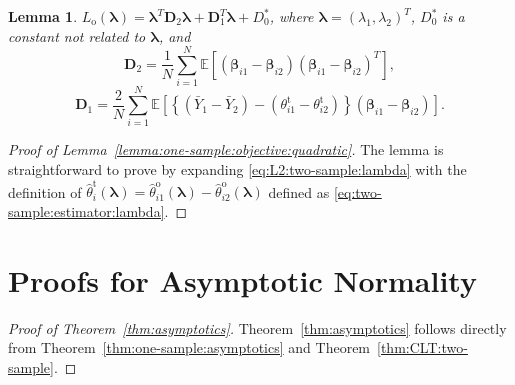 \documentclass[12pt,letterpaper]{article}
\newtheorem{lemma}{Lemma}[section]
\begin{document}
\begin{lemma}\label{lemma:two-sample:objective:quadratic}
$L_{\mathrm{o}}(\boldsymbol{\lambda})=\boldsymbol{\lambda}^T\mathbf{D}_{2}\boldsymbol{\lambda}+\mathbf{D}_{1}^T\boldsymbol{\lambda}+D_0^*$, where $\boldsymbol{\lambda}=(\lambda_1,\lambda_2)^T$, $D_0^*$ is a constant not related to $\boldsymbol{\lambda}$, and 
\begin{equation}\label{eq:coefficient:quadratic:two-sample:objective}
    \mathbf{D}_{2}=\frac{1}{N}\sum_{i=1}^N\mathbb{E}\left[(\boldsymbol{\beta}_{i1}-\boldsymbol{\beta}_{i2})(\boldsymbol{\beta}_{i1}-\boldsymbol{\beta}_{i2})^T\right],
\end{equation}
\begin{equation}\label{eq:coeff:linear:two-sample:objective}
\mathbf{D}_{1}=\frac{2}{N}\sum_{i=1}^N\mathbb{E}\left[\left\{(\bar{Y}_1-\bar{Y}_2)-(\theta_{i1}^{\mathrm{t}}-\theta_{i2}^{\mathrm{t}})\right\}(\boldsymbol{\beta}_{i1}-\boldsymbol{\beta}_{i2})\right].
\end{equation} 
\end{lemma}
\begin{proof}[Proof of Lemma~\ref{lemma:one-sample:objective:quadratic}]
The lemma is straightforward to prove by expanding \eqref{eq:L2:two-sample:lambda} with the definition of $\hat{\theta}_i^{\mathrm{t}}(\boldsymbol\lambda) = \hat{\theta}_{i1}^{\mathrm{o}}(\boldsymbol{\lambda}) - \hat{\theta}_{i2}^{\mathrm{o}}(\boldsymbol{\lambda})$  defined as \eqref{eq:two-sample:estimator:lambda}. 
\end{proof}

\section{Proofs for Asymptotic Normality}
\begin{proof}[Proof of Theorem~\ref{thm:asymptotics}]
Theorem~\ref{thm:asymptotics} follows directly from Theorem~\ref{thm:one-sample:asymptotics} and Theorem~\ref{thm:CLT:two-sample}.
\end{proof}
\end{document}
